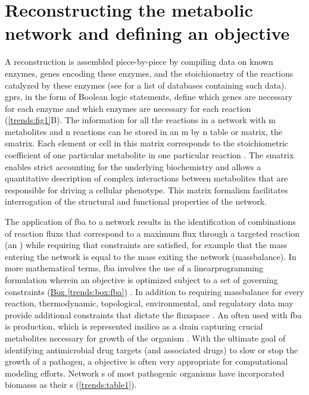 \section[Reconstructing metabolic networks]{Reconstructing the metabolic network and defining an objective}

A \gls{reconstruction} is assembled piece-by-piece 
by compiling data on known enzymes, genes encoding these enzymes, 
and the stoichiometry of the reactions catalyzed by these enzymes 
(see \cite{Durot:2009kb} for a list of databases containing such data). \glspl{gpr}, 
in the form of Boolean logic statements, define 
which genes are necessary for each enzyme and which enzymes are 
necessary for each reaction \cite{Thiele:2010fr} (\autoref{trends:fig1}B). The information for 
all the reactions in a network  with m metabolites 
and n reactions can be stored in an m by n table or matrix, the 
\gls{smatrix}. Each element or cell in this matrix 
corresponds to the stoichiometric coefficient of one particular 
metabolite in one particular reaction \cite{Thiele:2010fr,Lee:2006je}. The \gls{smatrix} enables 
strict accounting for the underlying biochemistry and allows a 
quantitative description of complex interactions between metabolites 
that are responsible for driving a cellular phenotype. This matrix 
formalism facilitates interrogation of the structural and functional 
properties of the network.



The application of \gls{fba} to a network  results in the 
identification of combinations of reaction \glspl{flux} that correspond 
to a maximum \gls{flux} through a targeted reaction (an ) while 
requiring that constraints are satisfied, for example that the 
mass entering the network is equal to the mass exiting the network (\gls{massbalance}). 
In more mathematical terms, \gls{fba} involves the use of a 
\gls{linearprogramming} formulation wherein an objective is optimized subject 
to a set of governing constraints (\hyperref[trends:box:fba]{Box \ref{trends:box:fba}}) 
\cite{Oberhardt:2009jw,Lee:2006je,Gianchandani:2010gs}. In addition 
to requiring \gls{massbalance} for every reaction, thermodynamic, 
topological, environmental, and regulatory data may provide 
additional constraints that dictate the \gls{fluxspace} \cite{Price:2004hx}. 
An  often used with \gls{fba} is  production, which is 
represented \gls{insilico} as a drain capturing crucial metabolites 
necessary for growth of the organism \cite{Feist:2010hq,Varma:1993hd}. With the ultimate 
goal of identifying antimicrobial drug targets (and associated 
drugs) to slow or stop the growth of a pathogen, a  objective
is often very appropriate for computational modeling efforts. 
Network s of most pathogenic organisms have incorporated 
\glspl{biomass} as their s (\autoref{trends:table1}).

